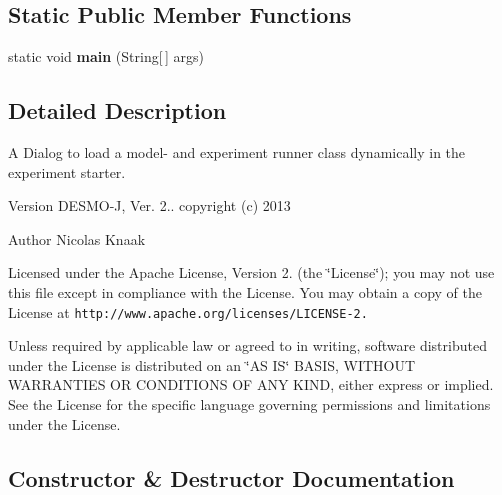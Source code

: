 \subsection*{Static Public Member Functions}
\begin{DoxyCompactItemize}
\item 
static void {\bfseries main} (String[$\,$] args)\label{classdesmoj_1_1extensions_1_1experimentation_1_1ui_1_1_load_model_dialog_adb66e2956472b0b1ec7706fe987936cc}

\end{DoxyCompactItemize}


\subsection{Detailed Description}
A Dialog to load a model-\/ and experiment runner class dynamically in the experiment starter.

\begin{DoxyVersion}{Version}
D\-E\-S\-M\-O-\/\-J, Ver. 2.. copyright (c) 2013 
\end{DoxyVersion}
\begin{DoxyAuthor}{Author}
Nicolas Knaak
\end{DoxyAuthor}
Licensed under the Apache License, Version 2. (the \char`\"{}\-License\char`\"{}); you may not use this file except in compliance with the License. You may obtain a copy of the License at {\tt http\-://www.\-apache.\-org/licenses/\-L\-I\-C\-E\-N\-S\-E-\/2.}

Unless required by applicable law or agreed to in writing, software distributed under the License is distributed on an \char`\"{}\-A\-S I\-S\char`\"{} B\-A\-S\-I\-S, W\-I\-T\-H\-O\-U\-T W\-A\-R\-R\-A\-N\-T\-I\-E\-S O\-R C\-O\-N\-D\-I\-T\-I\-O\-N\-S O\-F A\-N\-Y K\-I\-N\-D, either express or implied. See the License for the specific language governing permissions and limitations under the License. 

\subsection{Constructor \& Destructor Documentation}

